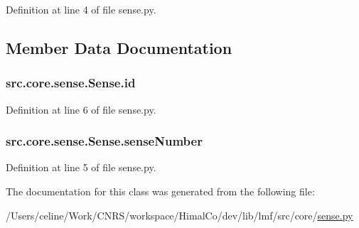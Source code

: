 Definition at line 4 of file sense.\+py.



\subsection{Member Data Documentation}
\hypertarget{classsrc_1_1core_1_1sense_1_1_sense_a37a8c62a8fbdbc3191b25b2654197307}{
\subsubsection[{id}]{\setlength{\rightskip}{0pt plus 5cm}src.\+core.\+sense.\+Sense.\+id}}\label{classsrc_1_1core_1_1sense_1_1_sense_a37a8c62a8fbdbc3191b25b2654197307}


Definition at line 6 of file sense.\+py.

\hypertarget{classsrc_1_1core_1_1sense_1_1_sense_acfebe4764025fd6062674315e2c4230f}{
\subsubsection[{sense\+Number}]{\setlength{\rightskip}{0pt plus 5cm}src.\+core.\+sense.\+Sense.\+sense\+Number}}\label{classsrc_1_1core_1_1sense_1_1_sense_acfebe4764025fd6062674315e2c4230f}


Definition at line 5 of file sense.\+py.



The documentation for this class was generated from the following file\+:\begin{DoxyCompactItemize}
\item 
/\+Users/celine/\+Work/\+C\+N\+R\+S/workspace/\+Himal\+Co/dev/lib/lmf/src/core/\hyperlink{sense_8py}{sense.\+py}\end{DoxyCompactItemize}
